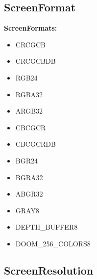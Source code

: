 \subsection{ScreenFormat}\label{subsec:screenformat}


\textbf{ScreenFormats:}
\begin{itemize}
     \item CRCGCB 
     \item CRCGCBDB
     \item RGB24
     \item RGBA32
     \item ARGB32
     \item CBCGCR
     \item CBCGCRDB
     \item BGR24
     \item BGRA32
     \item ABGR32
     \item GRAY8
     \item DEPTH\_BUFFER8
     \item DOOM\_256\_COLORS8
\end{itemize}
\subsection{ScreenResolution} \label{subsec:screenresolution}


